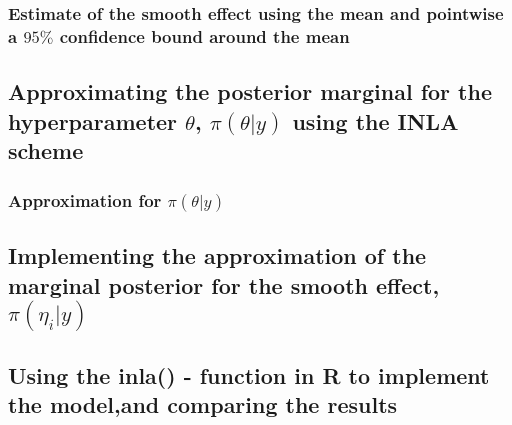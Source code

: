 \subsubsection{Estimate of the smooth effect using the mean and pointwise a $95 \%$ confidence bound around the mean}

\subsection{Approximating the posterior marginal for the hyperparameter $\theta$, $\pi(\theta|y)$ using the INLA scheme}

\subsubsection{Approximation for $\pi(\theta|y)$}

\subsection{Implementing the approximation of the marginal posterior for the smooth effect, $\pi(\eta_i | y)$}

\subsection{Using the inla() - function in R to implement the model,and comparing the results}

